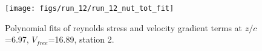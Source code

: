 \begin{figure}[H]
\centering
\texttt{[image: figs/run\_12/run\_12\_nut\_tot\_fit]}
\caption{Polynomial fits of reynolds stress and velocity gradient terms at $z/c$=6.97, $V_{free}$=16.89, station 2.}
\label{fig:run_12_nut_tot_fit}
\end{figure}


